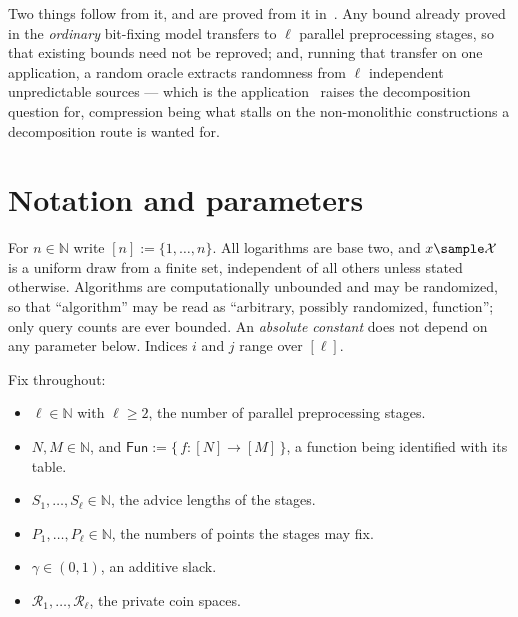 \documentclass{conjura-conjecture}
\newcommand{\Fun}{\mathsf{Fun}}
\begin{document}
Two things follow from it, and are proved from it in~\cite{PP}. Any bound
already proved in the \emph{ordinary} bit-fixing model transfers to $\ell$
parallel preprocessing stages, so that existing bounds need not be
reproved; and, running that transfer on one application, a random oracle
extracts randomness from $\ell$ independent unpredictable sources ---
which is the application~\cite[\S1.4]{CFHS} raises the decomposition
question for, compression being what stalls on the non-monolithic
constructions a decomposition route is wanted for.

\section{Notation and parameters}\label{sec:notation}

For $n \in \mathbb{N}$ write $[n] := \{1,\dots,n\}$. All logarithms are
base two, and $x \sample \mathcal{X}$ is a uniform draw from a finite set,
independent of all others unless stated otherwise. Algorithms are
computationally unbounded and may be randomized, so that ``algorithm'' may
be read as ``arbitrary, possibly randomized, function''; only query counts
are ever bounded. An \emph{absolute constant} does not depend on any
parameter below. Indices $i$ and $j$ range over $[\ell]$.

Fix throughout:
\begin{itemize}
\item $\ell \in \mathbb{N}$ with $\ell \ge 2$, the number of parallel
  preprocessing stages.
\item $N, M \in \mathbb{N}$, and $\Fun := \{\, f : [N] \to [M] \,\}$, a
  function being identified with its table.
\item $S_1,\dots,S_\ell \in \mathbb{N}$, the advice lengths of the stages.
\item $P_1,\dots,P_\ell \in \mathbb{N}$, the numbers of points the stages
  may fix.
\item $\gamma \in (0,1)$, an additive slack.
\item $\mathcal{R}_1,\dots,\mathcal{R}_\ell$, the private coin spaces.
\end{itemize}
\end{document}
